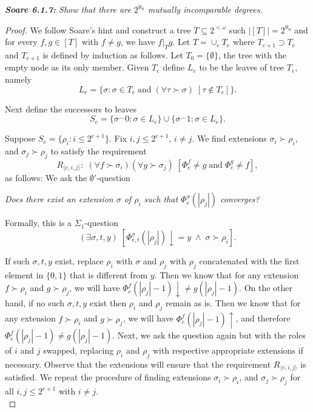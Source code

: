 \documentclass{article}
\begin{document}
\it \textbf{Soare 6.1.7:} Show that there are $2^{\aleph_0}$ mutually
  incomparable degrees.

  \begin{proof}
    We follow Soare's hint and construct a tree $T\subseteq2^{<\omega}$ such
    $|[T]|=2^{\aleph_0}$ and for every $f,g\in[T]$ with $f\neq g$, we have
    $f|_Tg$. Let $T=\cup_eT_e$ where $T_{e+1}\supset T_e$ and $T_{e+1}$ is
    defined by induction as follows. Let $T_0=\{\emptyset\}$, the tree with
    the empty node as its only member. Given $T_e$ define $L_e$ to be the
    leaves of tree $T_e$, namely
    \[L_e =\{\sigma: \sigma\in T_e\; \text{and}\; (\forall \tau \succ
    \sigma)\; [\tau\not\in T_e]\}.\]

    Next define the successors to leaves
    \[S_e =\{\sigma^\frown0: \sigma\in L_e\} \cup \{\sigma^\frown1:
    \sigma\in L_e\}.\]

    Suppose $S_e=\{\rho_i: i\leq2^{e+1}\}$. Fix $i,j\leq2^{e+1}$, $i\neq
    j$. We find extensions $\sigma_i\succ\rho_i$, and $\sigma_j\succ\rho_j$
    to satisfy the requirement
    \[R_{\langle e,i,j\rangle}:\; (\forall f\succ \sigma_i) (\forall g\succ
    \sigma_j)\; [\Phi_e^f\neq g\; \text{and}\; \Phi_e^g\neq f],\]
    as follows: We ask the $\emptyset'$-question
    \begin{center}
      \textit{Does there exist an extension $\sigma$ of $\rho_i$ such that
      $\Phi_e^{\sigma}(|\rho_j|)$ converges?}
    \end{center}

    Formally, this is a $\Sigma_1$-question 
    \[(\exists \sigma,t,y)\;
    [\Phi_{e,t}^\sigma (|\rho_j|)\downarrow=y\; \wedge\;
    \sigma\succ\rho_i].\]

    If such $\sigma,t,y$ exist, replace $\rho_i$ with $\sigma$ and $\rho_j$
    with $\rho_j$ concatenated with the first element in $\{0,1\}$ that is
    different from $y$. Then we know that for any extension $f\succ\rho_i$
    and $g\succ\rho_j$, we will have $\Phi_e^f(|\rho_j|-1)\downarrow\neq
    g(|\rho_j|-1)$. On the other hand, if no such $\sigma,t,y$ exist then
    $\rho_i$ and $\rho_j$ remain as is. Then we know that for any extension
    $f\succ\rho_i$ and $g\succ\rho_j$, we will have
    $\Phi_e^f(|\rho_j|-1)\uparrow$, and therefore $\Phi_e^f(|\rho_j|-1)\neq
    g(|\rho_j|-1)$. Next, we ask the question again but with the roles of
    $i$ and $j$ swapped, replacing $\rho_i$ and $\rho_j$ with respective
    appropriate extensions if necessary. Observe that the extensions will
    ensure that the requirement $R_{\langle e,i,j\rangle}$ is satisfied.
    We repeat the procedure of finding extensions $\sigma_i\succ\rho_i$,
    and $\sigma_j\succ\rho_j$ for all $i,j\leq2^{e+1}$ with $i\neq j$. \\


\end{proof}
\end{document}

